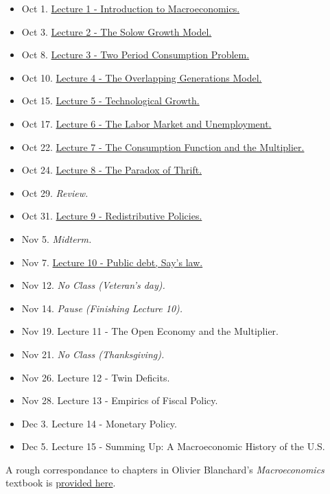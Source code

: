 \documentclass[]{book}
\providecommand{\tightlist}{%
  \setlength{\itemsep}{0pt}\setlength{\parskip}{0pt}}
\theoremstyle{definition}
\theoremstyle{definition}
\theoremstyle{definition}
\theoremstyle{remark}
\begin{document}
\begin{itemize}
\tightlist
\item
  Oct 1. \protect\hyperlink{intro-cobb}{Lecture 1 - Introduction to
  Macroeconomics.}
\item
  Oct 3. \protect\hyperlink{solow}{Lecture 2 - The Solow Growth Model.}
\item
  Oct 8. \protect\hyperlink{two-period}{Lecture 3 - Two Period
  Consumption Problem.}
\item
  Oct 10. \protect\hyperlink{olg}{Lecture 4 - The Overlapping
  Generations Model.}
\item
  Oct 15. \protect\hyperlink{technology}{Lecture 5 - Technological
  Growth.}
\item
  Oct 17. \protect\hyperlink{labor-market}{Lecture 6 - The Labor Market
  and Unemployment.}
\item
  Oct 22. \protect\hyperlink{cons-function}{Lecture 7 - The Consumption
  Function and the Multiplier.}
\item
  Oct 24. \protect\hyperlink{paradox-thrift}{Lecture 8 - The Paradox of
  Thrift.}
\item
  Oct 29. \emph{Review.}
\item
  Oct 31. \protect\hyperlink{redistributive}{Lecture 9 - Redistributive
  Policies.}
\item
  Nov 5. \emph{Midterm.}
\item
  Nov 7. \protect\hyperlink{public-debt}{Lecture 10 - Public debt, Say's
  law.}
\item
  Nov 12. \emph{No Class (Veteran's day).}
\item
  Nov 14. \emph{Pause (Finishing Lecture 10).}
\item
  Nov 19. Lecture 11 - The Open Economy and the Multiplier.
\item
  Nov 21. \emph{No Class (Thanksgiving).}
\item
  Nov 26. Lecture 12 - Twin Deficits.
\item
  Nov 28. Lecture 13 - Empirics of Fiscal Policy.
\item
  Dec 3. Lecture 14 - Monetary Policy.
\item
  Dec 5. Lecture 15 - Summing Up: A Macroeconomic History of the U.S.
\end{itemize}

A rough correspondance to chapters in Olivier Blanchard's
\emph{Macroeconomics} textbook is
\href{https://docs.google.com/spreadsheets/d/1OQzilQvOLusOsv16pJ3FgFN1YAadELe64jJAV2PEsF0/edit?usp=sharing}{provided
here}.
\end{document}
